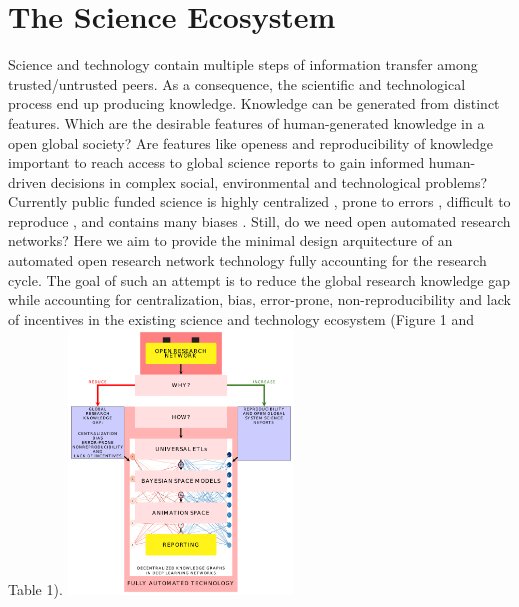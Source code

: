 \documentclass[10pt, a4paper, twocolumn]{article} %
\begin{document}
{\section{The Science Ecosystem}
Science and technology contain multiple steps of information transfer
among trusted/untrusted peers. As a consequence, the scientific and
technological process end up producing knowledge. Knowledge can be
generated from distinct features. Which are the desirable features of
human-generated knowledge in a open global society? Are features like
openess and reproducibility of knowledge important to reach access to
global science reports to gain informed human-driven decisions in
complex social, environmental and technological problems? Currently
public funded science is highly centralized
\citep{Inhaber1977,Gunther2018}⁠⁠, prone to errors \citep{Fang2011},
difficult to reproduce \citep{Hardwicke2018}, and contains many biases
\citep{Ioannidis2005}. Still, do we need open automated research
networks? Here we aim to provide the minimal design arquitecture of an
automated open research network technology fully accounting for the
research cycle. The goal of such an attempt is to reduce the global
research knowledge gap while accounting for centralization, bias,
error-prone, non-reproducibility and lack of incentives in the
existing science and technology ecosystem (Figure 1 and Table 1).
\includegraphics[width=0.45\textwidth]{flowchart.pdf}

}
\end{document}
